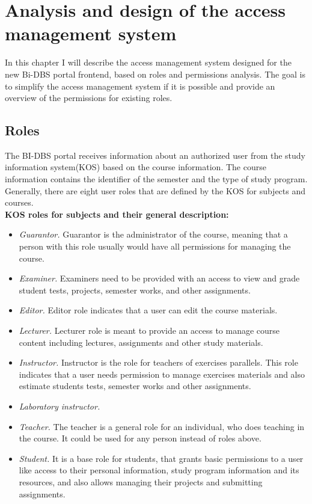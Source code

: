 \chapter{Analysis and design of the access management system} In this chapter I will describe the access management system designed for the new Bi-DBS portal frontend, based on roles and permissions analysis. The goal is to simplify the access management system if it is possible and provide an overview of the permissions for existing roles.


\section{Roles} The BI-DBS portal receives information about an authorized user from the study information system(KOS) based on the course information. The course information contains the identifier of the semester and the type of study program. Generally, there are eight user roles that are defined by the KOS for subjects and courses.\\

\noindent \textbf{KOS roles for subjects and their general description:}

\begin{itemize}
    \item \emph{Guarantor.} Guarantor is the administrator of the course, meaning that a person with this role usually would have all permissions for managing the course.
    \item \emph{Examiner.} Examiners need to be provided with an access to view and grade student tests, projects, semester works, and other assignments.
    \item \emph{Editor.} Editor role indicates that a user can edit the course materials.
    \item \emph{Lecturer.} Lecturer role is meant to provide an access to manage course content including lectures, assignments and other study materials.
    \item \emph{Instructor.} Instructor is the role for teachers of exercises parallels. This role indicates that a user needs permission to manage exercises materials and also estimate students tests, semester works and other assignments. 
    \item \emph{Laboratory instructor.}
    \item \emph{Teacher.} The teacher is a general role for an individual, who does teaching in the course. It could be used for any person instead of roles above.
    \item \emph{Student.} It is a base role for students, that grants basic permissions to a user like access to their personal information, study program information and its resources, and also allows managing their projects and submitting assignments.
\end{itemize}

